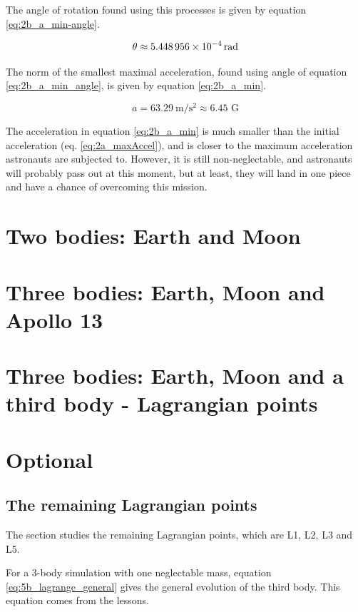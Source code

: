 \documentclass[a4paper,12pt,twoside]{article}
\begin{document}
The angle of rotation found using this processes is given by equation \eqref{eq:2b_a_min-angle}.

\begin{equation}
  \theta \approx \SI{5.448956d-4}{\radian} %
  \label{eq:2b_a_min_angle}
\end{equation}

The norm of the smallest maximal acceleration, found using angle of equation \eqref{eq:2b_a_min_angle}, is given by equation \eqref{eq:2b_a_min}.

\begin{equation}
  a = \SI{63.29}{\meter\per\square\second} \approx \num{6.45}\text{ G} %
  \label{eq:2b_a_min}
\end{equation}

The acceleration in equation \eqref{eq:2b_a_min} is much smaller than the initial acceleration (eq. \eqref{eq:2a_maxAccel}), and is closer to the maximum acceleration astronauts are subjected to.
However, it is still non-neglectable, and astronauts will probably pass out at this moment, but at least, they will land in one piece and have a chance of overcoming this mission.

\section{Two bodies: Earth and Moon}

\section{Three bodies: Earth, Moon and Apollo 13}

\section{Three bodies: Earth, Moon and a third body - Lagrangian points}

\section{Optional}
\subsection{The remaining Lagrangian points}
The section studies the remaining Lagrangian points, which are L1, L2, L3 and L5.

For a 3-body simulation with one neglectable mass, equation \eqref{eq:5b_lagrange_general} gives the general evolution of the third body.
This equation comes from the lessons.
\end{document}
